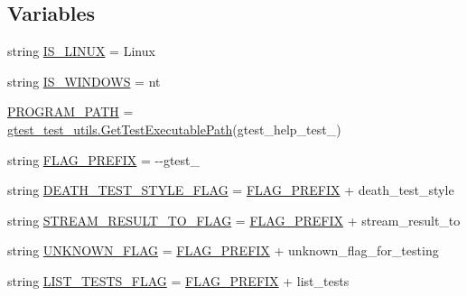 \subsection*{Variables}
\begin{DoxyCompactItemize}
\item 
string \hyperlink{namespacegtest__help__test_ae61a149d50be253176a139fbe6712582}{I\+S\+\_\+\+L\+I\+N\+UX} = \textquotesingle{}Linux\textquotesingle{}
\item 
string \hyperlink{namespacegtest__help__test_a0f8d4b00fc83b1e72bbb5eca5f3bc4d7}{I\+S\+\_\+\+W\+I\+N\+D\+O\+WS} = \textquotesingle{}nt\textquotesingle{}
\item 
\hyperlink{namespacegtest__help__test_a52878eacdd3a1534fa4743e7d134066c}{P\+R\+O\+G\+R\+A\+M\+\_\+\+P\+A\+TH} = \hyperlink{namespacegtest__test__utils_a89ed3717984a80ffbb7a9c92f71b86a2}{gtest\+\_\+test\+\_\+utils.\+Get\+Test\+Executable\+Path}(\textquotesingle{}gtest\+\_\+help\+\_\+test\+\_\+\textquotesingle{})
\item 
string \hyperlink{namespacegtest__help__test_a9e357a76dd993057c826ec411c9a4b3c}{F\+L\+A\+G\+\_\+\+P\+R\+E\+F\+IX} = \textquotesingle{}-\/-\/gtest\+\_\+\textquotesingle{}
\item 
string \hyperlink{namespacegtest__help__test_a322bbb8bf27d7701c76fb5704a1fda1f}{D\+E\+A\+T\+H\+\_\+\+T\+E\+S\+T\+\_\+\+S\+T\+Y\+L\+E\+\_\+\+F\+L\+AG} = \hyperlink{namespacegtest__help__test_a9e357a76dd993057c826ec411c9a4b3c}{F\+L\+A\+G\+\_\+\+P\+R\+E\+F\+IX} + \textquotesingle{}death\+\_\+test\+\_\+style\textquotesingle{}
\item 
string \hyperlink{namespacegtest__help__test_a06d67cce3cb57c484c169d1dbe4afd6c}{S\+T\+R\+E\+A\+M\+\_\+\+R\+E\+S\+U\+L\+T\+\_\+\+T\+O\+\_\+\+F\+L\+AG} = \hyperlink{namespacegtest__help__test_a9e357a76dd993057c826ec411c9a4b3c}{F\+L\+A\+G\+\_\+\+P\+R\+E\+F\+IX} + \textquotesingle{}stream\+\_\+result\+\_\+to\textquotesingle{}
\item 
string \hyperlink{namespacegtest__help__test_a400934cf13530098af31e2a65f1a8d84}{U\+N\+K\+N\+O\+W\+N\+\_\+\+F\+L\+AG} = \hyperlink{namespacegtest__help__test_a9e357a76dd993057c826ec411c9a4b3c}{F\+L\+A\+G\+\_\+\+P\+R\+E\+F\+IX} + \textquotesingle{}unknown\+\_\+flag\+\_\+for\+\_\+testing\textquotesingle{}
\item 
string \hyperlink{namespacegtest__help__test_a558dea5edfd6fdb48112401b257f5aea}{L\+I\+S\+T\+\_\+\+T\+E\+S\+T\+S\+\_\+\+F\+L\+AG} = \hyperlink{namespacegtest__help__test_a9e357a76dd993057c826ec411c9a4b3c}{F\+L\+A\+G\+\_\+\+P\+R\+E\+F\+IX} + \textquotesingle{}list\+\_\+tests\textquotesingle{}

\end{DoxyCompactItemize}
